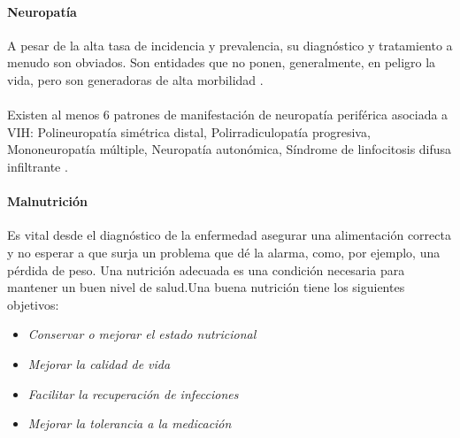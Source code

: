 \documentclass[a4paper,twocolumn,10pt]{article}
\begin{document}
\paragraph{Neuropatía} 
A pesar de la alta tasa de incidencia y prevalencia, su diagnóstico y tratamiento a menudo son obviados. Son entidades que no ponen, generalmente, en peligro la vida, pero son generadoras de alta morbilidad \cite{Ferri2002}. \\ \\
Existen al menos 6 patrones de manifestación de neuropatía periférica asociada a VIH: Polineuropatía simétrica distal, Polirradiculopatía progresiva, Mononeuropatía múltiple, Neuropatía autonómica, Síndrome de linfocitosis difusa infiltrante \cite{Ferri2002}.
\paragraph{Malnutrición}
Es vital desde el diagnóstico de la enfermedad asegurar una alimentación correcta y no esperar a que surja un problema que dé la alarma, como, por
ejemplo, una pérdida de peso. Una nutrición adecuada es una condición necesaria para mantener un buen nivel de salud.Una buena nutrición tiene los siguientes objetivos\cite{Herrera2004}:
\begin{itemize}
\item{\mdseries \itshape Conservar o mejorar el estado nutricional}
\item{\mdseries \itshape Mejorar la calidad de vida}
\item{\mdseries \itshape Facilitar la recuperación de infecciones}
\item{\mdseries \itshape Mejorar la tolerancia a la medicación}
\end{itemize}
\end{document}
